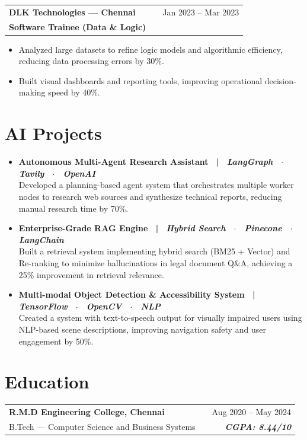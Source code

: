 \documentclass[a4paper,10pt]{article}
\begin{document}
\vspace{4pt}

\begin{tabularx}{\linewidth}{ @{}l X r@{} }
\textbf{DLK Technologies --- Chennai} & & \hfill \color[HTML]{371e77} Jan 2023 -- Mar 2023 \\
\color[HTML]{371e77}\textbf{Software Trainee (Data \& Logic)} & & \\
\end{tabularx}
\begin{itemize}[nosep, leftmargin=2em]
\item Analyzed large datasets to refine logic models and algorithmic efficiency, reducing data processing errors by 30\%.
\item Built visual dashboards and reporting tools, improving operational decision-making speed by 40\%.
\end{itemize}

\section{AI Projects}
\begin{itemize}[nosep, leftmargin=2em]
\item \textbf{Autonomous Multi-Agent Research Assistant ~|~ \textit{LangGraph ~$\cdot$~ Tavily ~$\cdot$~ OpenAI}} \\
Developed a planning-based agent system that orchestrates multiple worker nodes to research web sources and synthesize technical reports, reducing manual research time by 70\%.
\item \textbf{Enterprise-Grade RAG Engine ~|~ \textit{Hybrid Search ~$\cdot$~ Pinecone ~$\cdot$~ LangChain}} \\
Built a retrieval system implementing hybrid search (BM25 + Vector) and Re-ranking to minimize hallucinations in legal document Q\&A, achieving a 25\% improvement in retrieval relevance.
\item \textbf{Multi-modal Object Detection \& Accessibility System ~|~ \textit{TensorFlow ~$\cdot$~ OpenCV ~$\cdot$~ NLP}} \\
Created a system with text-to-speech output for visually impaired users using NLP-based scene descriptions, improving navigation safety and user engagement by 50\%.
\end{itemize}

\section{Education}
\begin{tabularx}{\linewidth}{ @{}l X r@{} }
\color[HTML]{1C033C} \textbf{R.M.D Engineering College, Chennai} & & \hfill \color[HTML]{371e77} Aug 2020 -- May 2024 \\
\color[HTML]{371e77} B.Tech — Computer Science and Business Systems & & \hfill \color[HTML]{4B28A4} \textit{\textbf{CGPA: 8.44/10}}
\end{tabularx}
\end{document}
